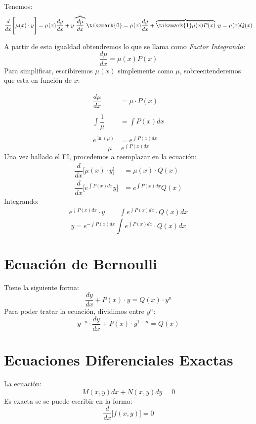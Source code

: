 Tenemos:
\[
\dfrac{d}{dx}\Bigg[\mu(x)\cdot y\Bigg]=\mu(x)\dfrac{dy}{dx}+y  \overbrace{\dfrac{d\mu}{dx}}\tikzmark{0}=\mu(x)\dfrac{dy}{dx}+ \overbrace{\tikzmark{1}\mu(x)P(x)}\cdot y =  \mu(x)Q(x)
\]
%
A partir de esta igualdad obtendremos lo que se llama como \textit{Factor Integrando:}
$$\dfrac{d\mu}{dx}=\mu(x)P(x)$$
Para simplificar, escribiremos $\mu(x)$ simplemente como $\mu$, sobreentenderemos que esta en función de $x$:

\begin{align*}
\dfrac{d\mu}{dx} & = \mu \cdot P(x) \\{ }\\
\int\dfrac{1}{\mu} & = \int P(x) dx \\{ }\\
e^{\ln(\mu)} & = e^{\int P(x) dx}
\end{align*}
\begin{equation}
\mu  = e^{\int P(x) dx}
\end{equation}
Una vez hallado el FI, procedemos a reemplazar en la ecuación:
\begin{align*}
\dfrac{d}{dx}\Big[ \mu(x)\cdot y \Big] & = \mu(x)\cdot Q(x) \\
\dfrac{d}{dx}\Big[ e^{\int P(x)dx} y \Big] & = e^{\int P(x) dx} Q(x)
\end{align*}
Integrando:
\begin{align*}
e^{\int P(x) dx} \cdot y & = \int e^{\int P(x) dx} \cdot Q(x) dx
\end{align*}
$$ \boxed{y  = e^{-\int P(x) dx} \int e^{\int P(x) dx} \cdot Q(x) dx}$$
\section{Ecuación de Bernoulli}
Tiene la siguiente forma:
$$\dfrac{dy}{dx}+P(x)\cdot y =Q(x)\cdot y^n $$
Para poder tratar la ecuación, dividimos entre $y^n$:
$$y^{-n}\cdot\dfrac{dy}{dx}+P(x)\cdot y^{1-n} =Q(x)$$
\section{Ecuaciones Diferenciales Exactas}
La ecuación:
\begin{equation}
M(x,y)dx+N(x,y)dy=0
\end{equation}
Es exacta se se puede escribir en la forma:
$$\dfrac{d}{dx}\Big[ f(x,y) \Big] = 0$$
